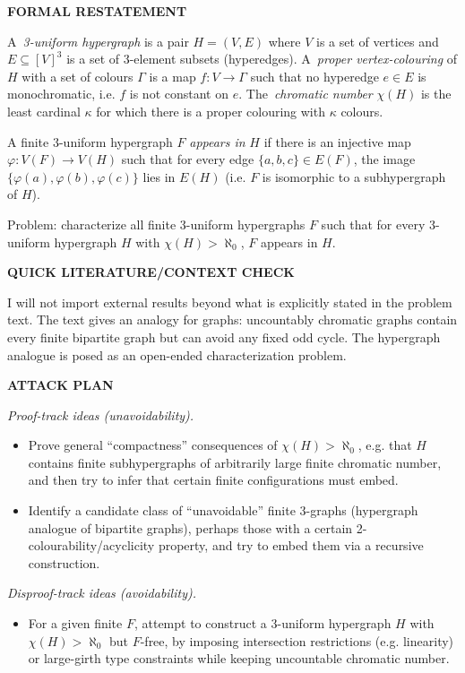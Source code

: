 \bigskip
\noindent\textbf{FORMAL RESTATEMENT}

A \,\emph{3-uniform hypergraph} is a pair $H=(V,E)$ where $V$ is a set of vertices and $E\subseteq [V]^3$ is a set of 3-element subsets (hyperedges).
A \,\emph{proper vertex-colouring} of $H$ with a set of colours $\Gamma$ is a map $f:V\to\Gamma$ such that no hyperedge $e\in E$ is monochromatic, i.e. $f$ is not constant on $e$.
The \,\emph{chromatic number} $\chi(H)$ is the least cardinal $\kappa$ for which there is a proper colouring with $\kappa$ colours.

A finite 3-uniform hypergraph $F$ \emph{appears in} $H$ if there is an injective map $\varphi:V(F)\to V(H)$ such that for every edge $\{a,b,c\}\in E(F)$, the image $\{\varphi(a),\varphi(b),\varphi(c)\}$ lies in $E(H)$ (i.e. $F$ is isomorphic to a subhypergraph of $H$).

Problem: characterize all finite 3-uniform hypergraphs $F$ such that for every 3-uniform hypergraph $H$ with $\chi(H)>\aleph_0$, $F$ appears in $H$.

\bigskip
\noindent\textbf{QUICK LITERATURE/CONTEXT CHECK}

I will not import external results beyond what is explicitly stated in the problem text.
The text gives an analogy for graphs: uncountably chromatic graphs contain every finite bipartite graph but can avoid any fixed odd cycle.
The hypergraph analogue is posed as an open-ended characterization problem.

\bigskip
\noindent\textbf{ATTACK PLAN}

\emph{Proof-track ideas (unavoidability).}
\begin{itemize}
\item Prove general ``compactness'' consequences of $\chi(H)>\aleph_0$, e.g. that $H$ contains finite subhypergraphs of arbitrarily large finite chromatic number, and then try to infer that certain finite configurations must embed.
\item Identify a candidate class of ``unavoidable'' finite 3-graphs (hypergraph analogue of bipartite graphs), perhaps those with a certain 2-colourability/acyclicity property, and try to embed them via a recursive construction.
\end{itemize}

\emph{Disproof-track ideas (avoidability).}
\begin{itemize}
\item For a given finite $F$, attempt to construct a 3-uniform hypergraph $H$ with $\chi(H)>\aleph_0$ but $F$-free, by imposing intersection restrictions (e.g. linearity) or large-girth type constraints while keeping uncountable chromatic number.
\end{itemize}

